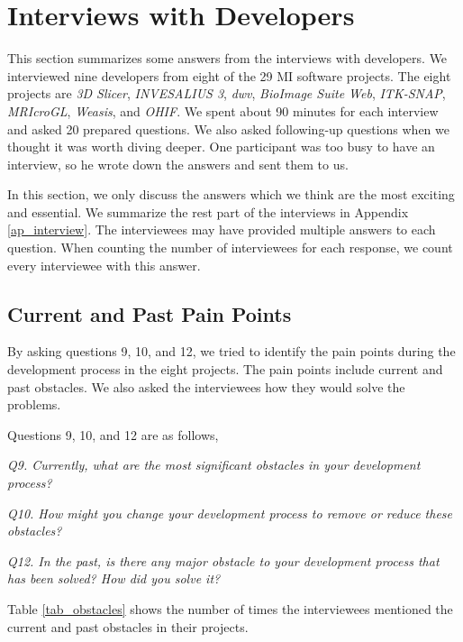 \chapter{Interviews with Developers}
\label{ch_interview}

This section summarizes some answers from the interviews with developers. We interviewed nine developers from eight of the 29 MI software projects. The eight projects are \textit{3D Slicer}, \textit{INVESALIUS 3}, \textit{dwv}, \textit{BioImage Suite Web}, \textit{ITK-SNAP}, \textit{MRIcroGL}, \textit{Weasis}, and \textit{OHIF}. We spent about 90 minutes for each interview and asked 20 prepared questions. We also asked following-up questions when we thought it was worth diving deeper. One participant was too busy to have an interview, so he wrote down the answers and sent them to us.

In this section, we only discuss the answers which we think are the most exciting and essential. We summarize the rest part of the interviews in Appendix \ref{ap_interview}. The interviewees may have provided multiple answers to each question. When counting the number of interviewees for each response, we count every interviewee with this answer.

\section{Current and Past Pain Points}

By asking questions 9, 10, and 12, we tried to identify the pain points during the development process in the eight projects. The pain points include current and past obstacles. We also asked the interviewees how they would solve the problems.

Questions 9, 10, and 12 are as follows,

\textit{Q9. Currently, what are the most significant obstacles in your development process?}

\textit{Q10. How might you change your development process to remove or reduce these obstacles?}

\textit{Q12. In the past, is there any major obstacle to your development process that has been solved? How did you solve it?}

Table \ref{tab_obstacles} shows the number of times the interviewees mentioned the current and past obstacles in their projects.

